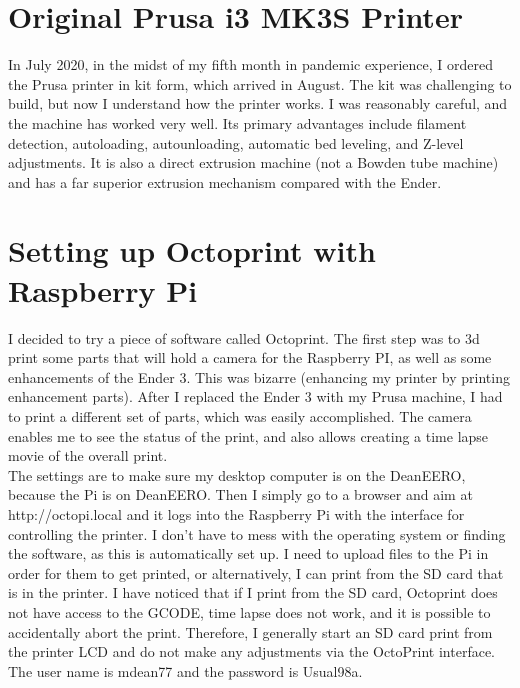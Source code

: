 \section{Original Prusa i3 MK3S Printer}
In July 2020, in the midst of my fifth month in pandemic experience, I ordered the Prusa printer in kit form, which arrived in August.  The kit was challenging to build, but now I understand how the printer works.  I was reasonably careful, and the machine has worked very well.  Its primary advantages include filament detection, autoloading, autounloading, automatic bed leveling, and Z-level adjustments.  It is also a direct extrusion machine (not a Bowden tube machine) and has a far superior extrusion mechanism compared with the Ender.

\section{Setting up Octoprint with Raspberry Pi}

I decided to try a piece of software called Octoprint.  The first step was to 3d print some parts that will hold a camera for the Raspberry PI, as well as some enhancements
of the Ender 3.  This was bizarre (enhancing my printer by printing enhancement parts).  After I replaced the Ender 3 with my Prusa machine, I had to print a different set of parts, which was easily accomplished.  The camera enables me to see the status of the print, and also allows creating a time lapse movie of the overall print.\\

The settings are to make sure my desktop computer is on the DeanEERO, because the Pi is on DeanEERO.  Then I simply go to a browser
and aim at http://octopi.local and it logs into the Raspberry Pi with the interface for controlling the printer.  I don't have to mess with the operating system or finding the software,
as this is automatically set up.  I need to upload files to the Pi in order for them to get printed, or alternatively, I can print from the SD
card that is in the printer.  I have noticed that if I print from the SD card, Octoprint does not have access to the GCODE, time lapse does not work, and it is possible to accidentally abort the print.  Therefore, I generally start an SD card print from the printer LCD and do not make any adjustments via the OctoPrint interface.\\


The user name is mdean77 and the password is Usual98a.  \\

